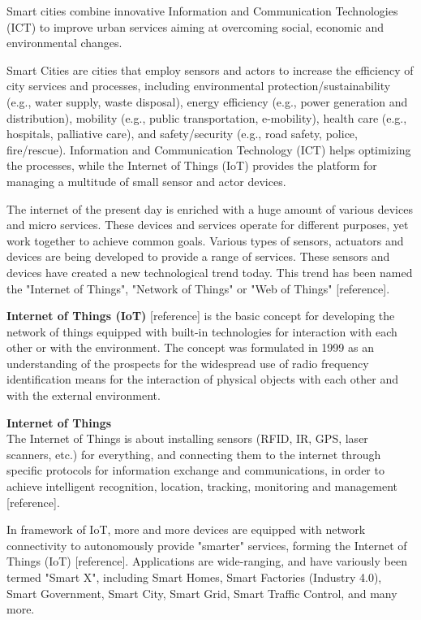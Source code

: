 Smart cities combine innovative Information and Communication Technologies (ICT) to improve urban services aiming at overcoming social, economic and environmental changes.

Smart Cities are cities that employ sensors and actors to increase the efficiency of city services and processes, including environmental protection/sustainability (e.g., water supply, waste disposal), energy efficiency (e.g., power generation and distribution), mobility (e.g., public transportation, e-mobility), health care (e.g., hospitals, palliative care), and safety/security (e.g., road safety, police, fire/rescue). Information and Communication Technology (ICT) helps optimizing the processes, while the Internet of Things (IoT) provides the platform for managing a multitude of small sensor and actor devices.

The internet of the present day is enriched with a huge amount of various devices and micro services. These devices and services operate for different purposes, yet work together to achieve common goals. Various types of sensors, actuators and devices are being developed to provide a range of services. These sensors and devices have created a new technological trend today. This trend has been named the "Internet of Things", "Network of Things" or "Web of Things" [reference]. 

\textbf{Internet of Things (IoT)} [reference] is the basic concept for developing the network of things equipped with built-in technologies for interaction with each other or with the environment. The concept was formulated in 1999 as an understanding of the prospects for the widespread use of radio frequency identification means for the interaction of physical objects with each other and with the external environment. 
\begin{definition}
\textbf{Internet of Things}\label{definition:internetOfThings}\\
The Internet of Things is about installing sensors (RFID, IR, GPS, laser scanners, etc.) for everything, and connecting them to the internet through specific protocols for information exchange and communications, in order to achieve intelligent recognition, location, tracking, monitoring and management [reference].
\end{definition}

In framework of IoT, more and more devices are equipped with network connectivity to autonomously provide "smarter" services, forming the Internet of Things (IoT) [reference]. Applications are wide-ranging, and have variously been termed "Smart X", including Smart Homes, Smart Factories (Industry 4.0), Smart Government, Smart City, Smart Grid, Smart Traffic Control, and many more.

